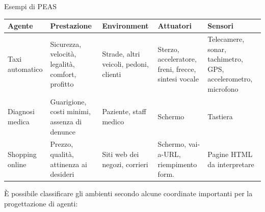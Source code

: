 \documentclass[a4paper,11pt]{report}
\begin{document}
    \vspace{0.5em}
\begin{gframe}{Esempi di PEAS}
      
\centering
\renewcommand{\arraystretch}{1.5}
\begin{tabularx}{\textwidth}{|l|X|X|X|X|}
\hline
\textbf{Agente} & \textbf{P}restazione & \textbf{E}nvironment & \textbf{A}ttuatori & \textbf{S}ensori \\ \hline

Taxi automatico &
Sicurezza, velocità, legalità, comfort, profitto &
Strade, altri veicoli, pedoni, clienti &
Sterzo, acceleratore, freni, frecce, sintesi vocale &
Telecamere, sonar, tachimetro, GPS, accelerometro, microfono \\ \hline

Diagnosi medica &
Guarigione, costi minimi, assenza di denunce &
Paziente, staff medico &
Schermo &
Tastiera \\ \hline

Shopping online &
Prezzo, qualità, attinenza ai desideri &
Siti web dei negozi, corrieri &
Schermo, vai-a-URL, riempimento form. &
Pagine HTML da interpretare \\ \hline

\end{tabularx}
  \end{gframe}  

  \newpage

È possibile classificare gli ambienti secondo alcune coordinate importanti per la progettazione di agenti:
\end{document}
